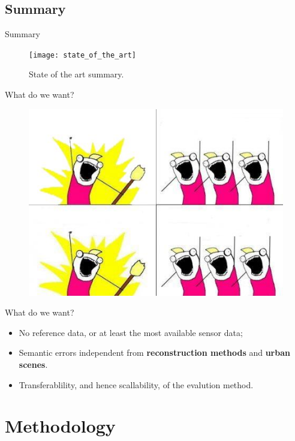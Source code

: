 \documentclass{beamer}
\begin{document}
        \subsection{Summary}
            \begin{frame}[plain]{Summary}
                \begin{figure}
                    \texttt{[image: state\_of\_the\_art]}
                    \caption{\label{fig::bib_summary} State of the art summary.}
                \end{figure}
            \end{frame}
            \begin{frame}{What do we want?}
                \begin{figure}
                    \includegraphics[width=.7\textwidth]{images/What-Do-We-Want}
                \end{figure}
            \end{frame}
            \begin{frame}{What do we want?}
                \begin{itemize}[label=$\blacktriangleright$, font=\color{IGNGreen}, itemsep=2em]
                    \item<1-> No reference data, or at least the most available sensor data;
                    \item<2-> Semantic errors independent from \textbf{reconstruction methods} and \textbf{urban scenes}.
                    \item<3-> Transferablility, and hence scallability, of the evalution method.
                \end{itemize}
            \end{frame}
    \section{Methodology}
\end{document}
